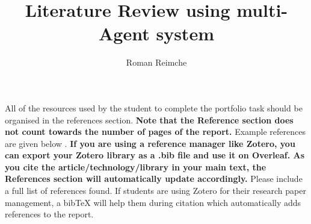 \documentclass[]{reflection}
\title{Literature Review using multi-Agent system}
\author{Roman Reimche
  \institute{RPTU Kaiserslautern, Faculty of Business and Economics}}
\begin{document}

\maketitle








\newpage
All of the resources used by the student to complete the portfolio task should be organised in the references section. 
\textbf {Note that the Reference section does not count towards the number of pages of the report.} Example references are given below \cite{einstein}\cite{knuthwebsite}\cite{latexcompanion}. \textbf{ If you are using a reference manager like Zotero, you can export your Zotero library as a .bib file and use it on Overleaf. As you cite the article/technology/library in your main text, the References section will automatically update accordingly.} Please include a full list of references found. If students are using Zotero for their research paper management, a bibTeX will help them during citation which automatically adds references to the report.  

\medskip



\end{document}
